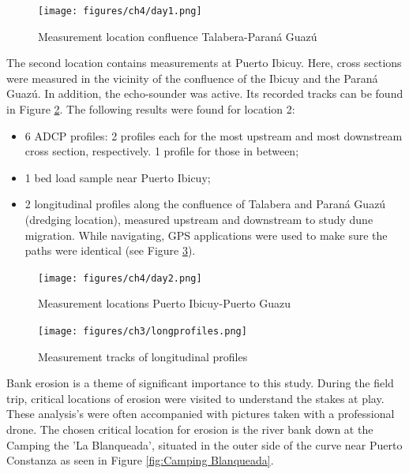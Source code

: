 \begin{figure}[H]
    \centering
    \texttt{[image: figures/ch4/day1.png]}
    \caption{Measurement location confluence Talabera-Paraná Guazú \autocite{googleGoogleEarth2025}}
    \label{fig:measurements day1}
\end{figure}

\vspace{0.2cm}
The second location contains measurements at Puerto Ibicuy. Here, cross sections were measured in the vicinity of the confluence of the Ibicuy and the Paraná Guazú. In addition, the echo-sounder was active. Its recorded tracks can be found in Figure \ref{fig:measurements day2}. The following results were found for location 2:
\begin{itemize}
    \item 6 ADCP profiles: 2 profiles each for the most upstream and most downstream cross section, respectively. 1 profile for those in between; 
    \item 1 bed load sample near Puerto Ibicuy;
    \item 2 longitudinal profiles along the confluence of Talabera and Paraná Guazú (dredging location), measured upstream and downstream to study dune migration. While navigating, GPS applications were used to make sure the paths were identical (see Figure \ref{fig:longprofiles map}).
\end{itemize}

\begin{figure}[H]
    \centering
    \texttt{[image: figures/ch4/day2.png]}
    \caption{Measurement locations Puerto Ibicuy-Puerto Guazu \autocite{googleGoogleEarth2025}}
    \label{fig:measurements day2}
\end{figure}

\begin{figure}[H]
    \centering
    \texttt{[image: figures/ch3/longprofiles.png]}
    \caption{Measurement tracks of longitudinal profiles \autocite{googleGoogleEarth2025}}
    \label{fig:longprofiles map}
\end{figure}

Bank erosion is a theme of significant importance to this study. During the field trip, critical locations of erosion were visited to understand the stakes at play. These analysis's were often accompanied with pictures taken with a professional drone. The chosen critical location for erosion is the river bank down at the Camping the 'La Blanqueada', situated in the outer side of the curve near Puerto Constanza as seen in Figure \ref{fig:Camping Blanqueada}.

